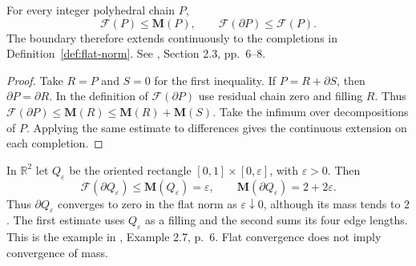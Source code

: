\begin{proposition}\label{prop:flat-boundary}
For every integer polyhedral chain $P$,
\[
 \mathcal{F}(P)\leq\mathbf{M}(P),\qquad
 \mathcal{F}(\partial P)\leq\mathcal{F}(P).
\]
The boundary therefore extends continuously to the completions in Definition~\ref{def:flat-norm}. See \cite{WhiCho14}, Section 2.3, pp.~6--8.
\end{proposition}
\begin{proof}
Take $R=P$ and $S=0$ for the first inequality. If $P=R+\partial S$, then $\partial P=\partial R$. In the definition of $\mathcal{F}(\partial P)$ use residual chain zero and filling $R$. Thus
$\mathcal{F}(\partial P)\leq\mathbf{M}(R)\leq\mathbf{M}(R)+\mathbf{M}(S)$.
Take the infimum over decompositions of $P$. Applying the same estimate to differences gives the continuous extension on each completion.
\end{proof}

\begin{example}\label{ex:thin-rectangle}
In $\mathbb{R}^2$ let $Q_\varepsilon$ be the oriented rectangle $[0,1]\times[0,\varepsilon]$, with $\varepsilon>0$. Then
\[
 \mathcal{F}(\partial Q_\varepsilon)\leq\mathbf{M}(Q_\varepsilon)=\varepsilon,
 \qquad \mathbf{M}(\partial Q_\varepsilon)=2+2\varepsilon.
\]
Thus $\partial Q_\varepsilon$ converges to zero in the flat norm as $\varepsilon\downarrow0$, although its mass tends to $2$. The first estimate uses $Q_\varepsilon$ as a filling and the second sums its four edge lengths. This is the example in \cite{WhiCho14}, Example 2.7, p.~6. Flat convergence does not imply convergence of mass.
\end{example}
